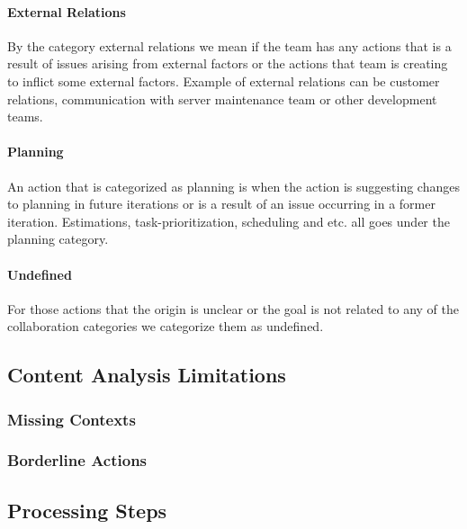 \paragraph{External Relations}
By the category external relations we mean if the team has any actions that is a result of issues arising from external factors or the actions that team is creating to inflict some external factors. Example of external relations can be customer relations, communication with server maintenance team or other development teams.  
\paragraph{Planning}
An action that is categorized as planning is when the action is suggesting changes to planning in future iterations or is a result of an issue occurring in a former iteration. Estimations, task-prioritization, scheduling and etc. all goes under the planning category. 
\paragraph{Undefined}
For those actions that the origin is unclear or the goal is not related to any of the collaboration categories we categorize them as undefined.
\subsection{Content Analysis Limitations}
\subsubsection{Missing Contexts}
\subsubsection{Borderline Actions}
\subsection{Processing Steps}
